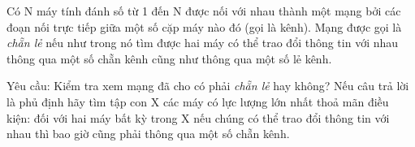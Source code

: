 Có N máy tính đánh số từ 1 đến N được nối với nhau thành một mạng bởi các đoạn nối trực tiếp giữa một số cặp máy nào đó (gọi là kênh). Mạng   được gọi là   \emph{    chẵn lẻ   }   nếu như trong nó tìm được hai máy có thể trao đổi thông tin với nhau thông qua một số chẵn kênh cũng như thông qua một   số lẻ kênh.  

   Yêu cầu: Kiểm tra xem mạng đã cho có phải   \emph{    chẵn lẻ   }   hay không? Nếu câu trả lời là phủ định hãy tìm tập con X các máy có lực lượng lớn   nhất thoả mãn điều kiện: đối với hai máy bất kỳ trong X nếu chúng có thể trao đổi thông tin với nhau thì bao giờ cũng phải thông qua một số chẵn kênh.  

\